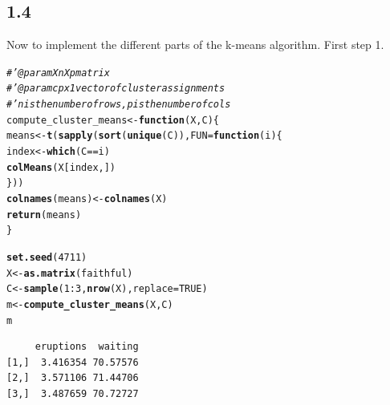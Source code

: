 \documentclass[10pt, a4paper, english]{article}\usepackage[]{graphicx}\usepackage[dvipsnames]{xcolor}
\makeatletter
\newcommand{\hlnum}[1]{\textcolor[rgb]{0.686,0.059,0.569}{#1}}%
\newcommand{\hlcom}[1]{\textcolor[rgb]{0.678,0.584,0.686}{\textit{#1}}}%
\newcommand{\hlopt}[1]{\textcolor[rgb]{0,0,0}{#1}}%
\newcommand{\hlstd}[1]{\textcolor[rgb]{0.345,0.345,0.345}{#1}}%
\newcommand{\hlkwa}[1]{\textcolor[rgb]{0.161,0.373,0.58}{\textbf{#1}}}%
\newcommand{\hlkwb}[1]{\textcolor[rgb]{0.69,0.353,0.396}{#1}}%
\newcommand{\hlkwc}[1]{\textcolor[rgb]{0.333,0.667,0.333}{#1}}%
\newcommand{\hlkwd}[1]{\textcolor[rgb]{0.737,0.353,0.396}{\textbf{#1}}}%
\newenvironment{kframe}{%
 \def\at@end@of@kframe{}%
 \ifinner\ifhmode%
  \def\at@end@of@kframe{\end{minipage}}%
  \begin{minipage}{\columnwidth}%
 \fi\fi%
 \def\FrameCommand##1{\hskip\@totalleftmargin \hskip-\fboxsep
 \colorbox{shadecolor}{##1}\hskip-\fboxsep
     \hskip-\linewidth \hskip-\@totalleftmargin \hskip\columnwidth}%
 \MakeFramed {\advance\hsize-\width
   \@totalleftmargin\z@ \linewidth\hsize
   \@setminipage}}%
 {\par\unskip\endMakeFramed%
 \at@end@of@kframe}
\newenvironment{knitrout}{}{} %
\makeatother
\begin{document}
\subsection{1.4 } 
Now to implement the different parts of the k-means algorithm. First step 1.

\begin{knitrout}
\color{fgcolor}\begin{kframe}
\begin{alltt}
\hlcom{#' @param X n X p matrix}
\hlcom{#' @param c p x 1 vector of cluster assignments}
\hlcom{#' n is the number of rows, p is the number of cols}
\hlstd{compute_cluster_means} \hlkwb{<-} \hlkwa{function}\hlstd{(}\hlkwc{X}\hlstd{,} \hlkwc{C}\hlstd{) \{}
  \hlstd{means} \hlkwb{<-} \hlkwd{t}\hlstd{(}\hlkwd{sapply}\hlstd{(}\hlkwd{sort}\hlstd{(}\hlkwd{unique}\hlstd{(C)),} \hlkwc{FUN} \hlstd{=} \hlkwa{function}\hlstd{(}\hlkwc{i}\hlstd{)\{}
   \hlstd{index} \hlkwb{<-} \hlkwd{which}\hlstd{(C} \hlopt{==} \hlstd{i)}
   \hlkwd{colMeans}\hlstd{(X[index,])}
\hlstd{\}))}
\hlkwd{colnames}\hlstd{(means)} \hlkwb{<-} \hlkwd{colnames}\hlstd{(X)}
\hlkwd{return}\hlstd{(means)}
\hlstd{\}}

\hlkwd{set.seed}\hlstd{(}\hlnum{4711}\hlstd{)}
\hlstd{X} \hlkwb{<-} \hlkwd{as.matrix}\hlstd{(faithful)}
\hlstd{C} \hlkwb{<-} \hlkwd{sample}\hlstd{(}\hlnum{1}\hlopt{:} \hlnum{3}\hlstd{,} \hlkwd{nrow}\hlstd{(X),} \hlkwc{replace} \hlstd{=} \hlnum{TRUE}\hlstd{)}
\hlstd{m} \hlkwb{<-} \hlkwd{compute_cluster_means}\hlstd{(X,C)}
\hlstd{m}
\end{alltt}
\begin{verbatim}
     eruptions  waiting
[1,]  3.416354 70.57576
[2,]  3.571106 71.44706
[3,]  3.487659 70.72727
\end{verbatim}
\end{kframe}
\end{knitrout}
\end{document}
